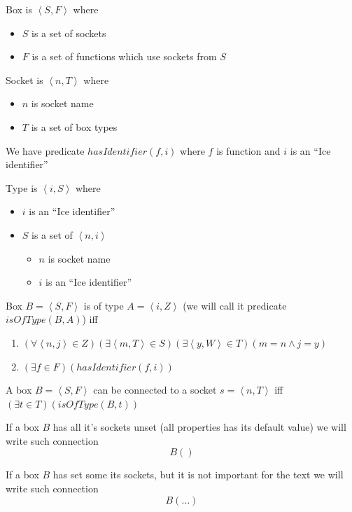 \documentclass[a4paper,12pt]{book}
\begin{document}
Box is $\left<S,F\right>$ where
\begin{itemize}
	\item $S$ is a set of sockets
	\item $F$ is a set of functions which use sockets from $S$
\end{itemize}
	
Socket is $\left<n,T\right>$ where
\begin{itemize}
	\item $n$ is socket name
	\item $T$ is a set of box types
\end{itemize}

We have predicate $hasIdentifier(f,i)$ where $f$ is function and $i$ is an ``Ice identifier''

Type is $\left<i,S\right>$ where
\begin{itemize}
	\item $i$ is an ``Ice identifier''
	\item $S$ is a set of $\left<n,i\right>$
	\begin{itemize}
		\item $n$ is socket name
		\item $i$ is an ``Ice identifier''
	\end{itemize}
\end{itemize}

Box $B=\left<S,F\right>$ is of type $A=\left<i,Z\right>$ (we will call it predicate $isOfType(B,A)$) iff 
\begin{enumerate}
	\item $(\forall \left<n,j\right>\in Z)(\exists \left<m,T\right>\in S)(\exists \left<y,W\right>\in T)(m=n \wedge j=y)$
	\item $(\exists f\in F)(hasIdentifier(f,i))$
\end{enumerate}

A box $B=\left<S,F\right>$ can be connected to a socket $s=\left<n,T\right>$ iff $(\exists t\in T)(isOfType(B,t))$

If a box $B$ has all it's sockets unset (all properties has its default value) we will write such connection
\begin{equation}
B()
\end{equation}

If a box $B$ has set some its sockets, but it is not important for the text we will write such connection
\begin{equation}
B(\dots)
\end{equation}
\end{document}
